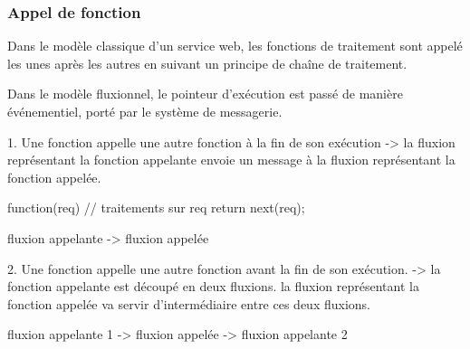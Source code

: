 		\subsubsection{Appel de fonction}

			Dans le modèle classique d'un service web, les fonctions de traitement sont appelé les unes après les autres en suivant un principe de chaîne de traitement.

			Dans le modèle fluxionnel, le pointeur d'exécution est passé de manière événementiel, porté par le système de messagerie.

			1. Une fonction appelle une autre fonction à la fin de son exécution
			    -> la fluxion représentant la fonction appelante envoie un message à la fluxion représentant la fonction appelée.

			\begin{code}[Javascript, caption={Code fluxionnel},label={lst:fn1}]
				function(req) {
				    // traitements sur req
				    return next(req);
				}
			\end{code}

			fluxion appelante -> fluxion appelée

			2. Une fonction appelle une autre fonction avant la fin de son exécution.
			    -> la fonction appelante est découpé en deux fluxions.
			    la fluxion représentant la fonction appelée va servir d'intermédiaire entre ces deux fluxions.

			fluxion appelante 1 -> fluxion appelée -> fluxion appelante 2
